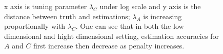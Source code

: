 \documentclass[fleqn]{article}
\begin{document}
\begin{figure}
\centering
{}
\caption{x axis is tuning parameter $\lambda_C$ under log scale and y axis is the distance between truth and estimations; $\lambda_A$ is increasing proportionally with $\lambda_C$. One can see that in both the low dimensional and hight dimensional setting, estimation accuracies for $A$ and $C$ first increase then decrease as penalty increases.}
\label{fig:low-high-d-sim}
\end{figure}
\end{document}
